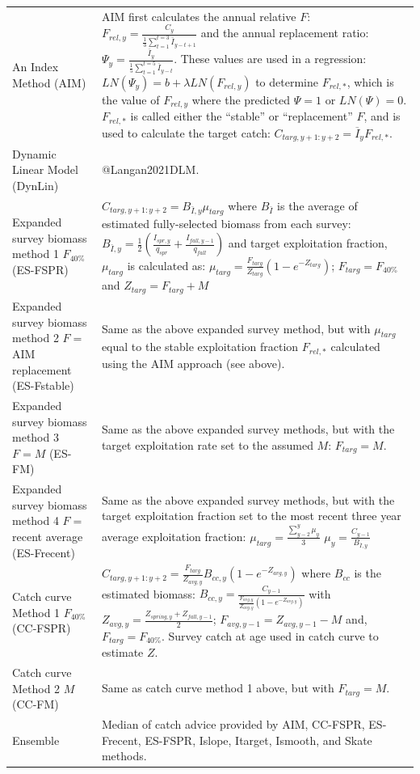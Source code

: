 \documentclass[
  12pt,
]{article}
\begin{document}
\begin{longtable}[]{@{}
  >{\raggedright\arraybackslash}p{}
  >{\raggedright\arraybackslash}p{}@{}}
An Index Method (AIM) & AIM first calculates the annual relative \(F\): \(F_{rel,y}=\frac{C_y}{\frac{1}{3}\sum_{t=1}^{t=3}\overline{I}_{y-t+1}}\) and the annual replacement ratio: \(\Psi_y = \frac{\overline{I}_y}{\frac{1}{5}\sum_{t=1}^{t=5}\overline{I}_{y-t}}\). These values are used in a regression: \(LN(\Psi_y)= b + \lambda LN(F_{rel,y})\) to determine \(F_{rel,*}\), which is the value of \(F_{rel,y}\) where the predicted \(\Psi=1\) or \(LN(\Psi)=0\). \(F_{rel,*}\) is called either the ``stable'' or ``replacement'' \(F\), and is used to calculate the target catch: \(C_{targ,y+1:y+2} = \overline{I}_yF_{rel,*}\). \\
Dynamic Linear Model (DynLin) & @Langan2021DLM. \\
Expanded survey biomass method 1 \(F_{40\%}\) (ES-FSPR) & \(C_{targ,y+1:y+2}=B_{\bar{I},y}\mu_{targ}\) where \(B_{\bar{I}}\) is the average of estimated fully-selected biomass from each survey: \(B_{\bar{I},y}=\frac{1}{2}\left(\frac{I_{spr,y}}{q_{spr}} +\frac{I_{fall,y-1}}{q_{fall}}\right)\) and target exploitation fraction, \(\mu_{targ}\) is calculated as: \(\mu_{targ}=\frac{F_{targ}}{Z_{targ}}\left(1-e^{-Z_{targ}}\right)\); \(F_{targ}=F_{40\%}\) and \(Z_{targ}=F_{targ}+M\) \\
Expanded survey biomass method 2 \(F=\) AIM replacement (ES-Fstable) & Same as the above expanded survey method, but with \(\mu_{targ}\) equal to the stable exploitation fraction \(F_{rel,*}\) calculated using the AIM approach (see above). \\
Expanded survey biomass method 3 \(F=M\) (ES-FM) & Same as the above expanded survey methods, but with the target exploitation rate set to the assumed \(M\): \(F_{targ}=M\). \\
Expanded survey biomass method 4 \(F=\) recent average (ES-Frecent) & Same as the above expanded survey methods, but with the target exploitation fraction set to the most recent three year average exploitation fraction: \({\mu_{targ}}=\frac{\sum_{y-2}^{y}\mu_y}{3}\) \(\mu_{y}=\frac{C_{y-1}}{B_{\bar{I},y}}\) \\
Catch curve Method 1 \(F_{40\%}\) (CC-FSPR) & \(C_{targ,y+1:y+2}= \frac{F_{targ}}{Z_{avg,y}}B_{cc,y}\left(1-e^{-Z_{avg,y}}\right)\) where \(B_{cc}\) is the estimated biomass: \(B_{cc,y} = \frac{C_{y-1}}{\frac{F_{avg,y}}{Z_{avg,y}}{\left(1-e^{-Z_{avg,y}}\right)}}\) with \(Z_{avg,y} = \frac{Z_{spring, y}+Z_{fall,y-1}}{2}\); \(F_{avg,y-1} = Z_{avg,y-1} - M\) and, \(F_{targ}=F_{40\%}\). Survey catch at age used in catch curve to estimate \(Z\). \\
Catch curve Method 2 \(M\) (CC-FM) & Same as catch curve method 1 above, but with \(F_{targ}=M\). \\
Ensemble & Median of catch advice provided by AIM, CC-FSPR, ES-Frecent, ES-FSPR, Islope, Itarget, Ismooth, and Skate methods. \\
\bottomrule
\end{longtable}
\end{document}
